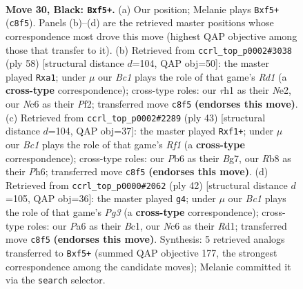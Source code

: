 \documentclass[11pt]{article}
\begin{document}
\clearpage

\begin{figure}[p]\centering
\begin{subfigure}{0.46\textwidth}\centering
\resizebox{\linewidth}{!}{%
\newchessgame
\chessboard[
  setfen={1rb2k2/4rP2/ppn5/2p1pQp1/P7/2P2P2/6PP/1KN1RBNR b - - 0 30},
  showmover=false,
  pgfstyle=straightmove, color=movearrow, markmove={c8-f5}
]}
\caption{}
\end{subfigure}\hfill
\begin{subfigure}{0.46\textwidth}\centering
\resizebox{\linewidth}{!}{%
\newchessgame
\chessboard[
  setfen={5r1k/1p2r1np/p1p2n2/3p2p1/PP6/3BP1PP/4NPK1/q2R1R2 w - - 0 30},
  showmover=false,
  pgfstyle=straightmove, color=movearrow, markmove={d1-a1}
]}
\caption{}
\end{subfigure}
\\[4pt]
\begin{subfigure}{0.46\textwidth}\centering
\resizebox{\linewidth}{!}{%
\newchessgame
\chessboard[
  setfen={5rk1/pp1r2b1/2np2pp/4p3/2P1P3/1P2B2P/1P4P1/3RNQK1 b - - 0 22},
  showmover=false,
  pgfstyle=straightmove, color=movearrow, markmove={f8-f1}
]}
\caption{}
\end{subfigure}\hfill
\begin{subfigure}{0.46\textwidth}\centering
\resizebox{\linewidth}{!}{%
\newchessgame
\chessboard[
  setfen={2r1k3/pr1nbp2/4p3/4p1p1/2P4p/1PN2PPP/P5K1/R1BR4 w - - 0 22},
  showmover=false,
  pgfstyle=straightmove, color=movearrow, markmove={g3-g4}
]}
\caption{}
\end{subfigure}
\caption{\textbf{Move 30, Black: \texttt{Bxf5+}.} (a) Our position; Melanie plays \texttt{Bxf5+} (\texttt{c8f5}). Panels (b)--(d) are the retrieved master positions whose correspondence most drove this move (highest QAP objective among those that transfer to it). (b) Retrieved from \texttt{ccrl\_top\_p0002\#3038} (ply 58) [structural distance $d$=104, QAP obj=50]: the master played \texttt{Rxa1}; under $\mu$ our \emph{Bc1} plays the role of that game's \emph{Rd1} (a \textbf{cross-type} correspondence); cross-type roles: our \emph{r}h1 as their \emph{N}e2, our \emph{N}c6 as their \emph{P}f2; transferred move \texttt{c8f5} \textbf{(endorses this move)}. (c) Retrieved from \texttt{ccrl\_top\_p0002\#2289} (ply 43) [structural distance $d$=104, QAP obj=37]: the master played \texttt{Rxf1+}; under $\mu$ our \emph{Bc1} plays the role of that game's \emph{Rf1} (a \textbf{cross-type} correspondence); cross-type roles: our \emph{P}b6 as their \emph{B}g7, our \emph{R}b8 as their \emph{P}h6; transferred move \texttt{c8f5} \textbf{(endorses this move)}. (d) Retrieved from \texttt{ccrl\_top\_p0000\#2062} (ply 42) [structural distance $d$=105, QAP obj=36]: the master played \texttt{g4}; under $\mu$ our \emph{Bc1} plays the role of that game's \emph{Pg3} (a \textbf{cross-type} correspondence); cross-type roles: our \emph{P}a6 as their \emph{B}c1, our \emph{N}c6 as their \emph{R}d1; transferred move \texttt{c8f5} \textbf{(endorses this move)}. Synthesis: 5 retrieved analogs transferred to \texttt{Bxf5+} (summed QAP objective 177, the strongest correspondence among the candidate moves); Melanie committed it via the \texttt{search} selector.}
\label{fig:thought-m59}
\end{figure}
\end{document}
